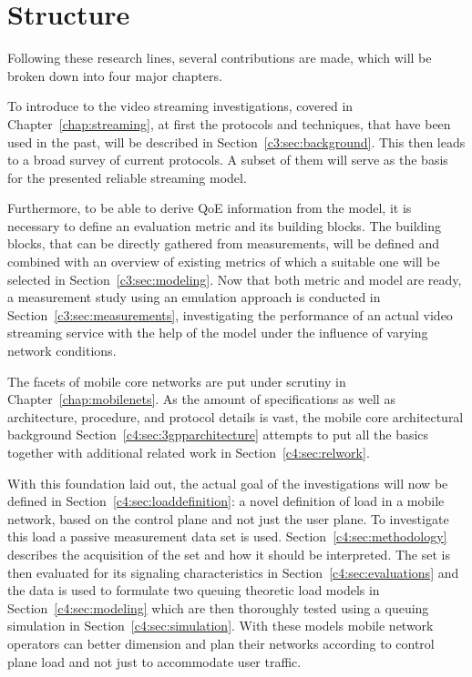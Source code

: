\section{Structure}

Following these research lines, several contributions are made, which will be broken down into four major chapters.

To introduce to the video streaming investigations, covered in Chapter~\ref{chap:streaming}, at first the protocols and techniques, that have been used in the past, will be described in Section~\ref{c3:sec:background}. This then leads to a broad survey of current protocols. A subset of them will serve as the basis for the presented reliable streaming model. 

Furthermore, to be able to derive \gls{QoE} information from the model, it is necessary to define an evaluation metric and its building blocks. The building blocks, that can be directly gathered from measurements, will be defined and combined with an overview of existing metrics of which a suitable one will be selected in Section~\ref{c3:sec:modeling}. Now that both metric and model are ready, a measurement study using an emulation approach is conducted in Section~\ref{c3:sec:measurements}, investigating the performance of an actual video streaming service with the help of the model under the influence of varying network conditions.

The facets of mobile core networks are put under scrutiny in Chapter~\ref{chap:mobilenets}. As the amount of specifications as well as architecture, procedure, and protocol details is vast, the mobile core architectural background Section~\ref{c4:sec:3gpparchitecture} attempts to put all the basics together with additional related work in Section~\ref{c4:sec:relwork}.

With this foundation laid out, the actual goal of the investigations will now be defined in Section~\ref{c4:sec:loaddefinition}: a novel definition of load in a mobile network, based on the control plane and not just the user plane. To investigate this load a passive measurement data set is used. Section~\ref{c4:sec:methodology} describes the acquisition of the set and how it should be interpreted. The set is then evaluated for its signaling characteristics in Section~\ref{c4:sec:evaluations} and the data is used to formulate two queuing theoretic load models in Section~\ref{c4:sec:modeling} which are then thoroughly  tested using a queuing simulation in Section~\ref{c4:sec:simulation}. With these models mobile network operators can better dimension and plan their networks according to control plane load and not just to accommodate user traffic.


